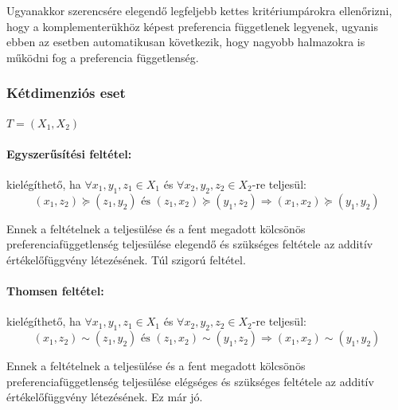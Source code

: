 \documentclass[a4paper,12pt]{article}
\begin{document}
Ugyanakkor szerencsére elegendő legfeljebb kettes kritériumpárokra ellenőrizni, hogy a komplementerükhöz képest preferencia függetlenek legyenek, ugyanis ebben az esetben automatikusan következik, hogy nagyobb halmazokra is működni fog a preferencia függetlenség.

\subsubsection{Kétdimenziós eset}

$T=(X_1,X_2)$

\paragraph{Egyszerűsítési feltétel: } kielégíthető, ha $\forall x_1, y_1, z_1 \in X_1$ és $\forall x_2, y_2, z_2 \in X_2$-re teljesül: 
\begin{equation}
(x_1, z_2) \succeq (z_1, y_2) \text{ és } (z_1, x_2) \succeq (y_1, z_2)  
\Rightarrow
(x_1, x_2) \succeq (y_1, y_2)
\end{equation} 

Ennek a feltételnek a teljesülése és a fent megadott kölcsönös preferenciafüggetlenség teljesülése elegendő és szükséges feltétele az additív értékelőfüggvény létezésének. Túl szigorú feltétel.

\paragraph{Thomsen feltétel:} kielégíthető, ha $\forall x_1, y_1, z_1 \in X_1$ és $\forall x_2, y_2, z_2 \in X_2$-re teljesül: 
\begin{equation}
(x_1, z_2) \sim (z_1, y_2) \text{ és } (z_1, x_2) \sim (y_1, z_2)  
\Rightarrow
(x_1, x_2) \sim (y_1, y_2)
\end{equation} 

Ennek a feltételnek a teljesülése és a fent megadott kölcsönös preferenciafüggetlenség teljesülése elégséges és szükséges feltétele az additív értékelőfüggvény létezésének. Ez már jó.

\end{document}
